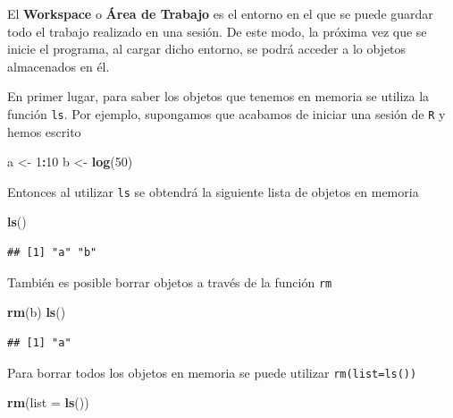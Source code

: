 \documentclass[]{book}
\newenvironment{Shaded}{\begin{snugshade}}{\end{snugshade}}
\newcommand{\DataTypeTok}[1]{\textcolor[rgb]{0.13,0.29,0.53}{#1}}
\newcommand{\DecValTok}[1]{\textcolor[rgb]{0.00,0.00,0.81}{#1}}
\newcommand{\KeywordTok}[1]{\textcolor[rgb]{0.13,0.29,0.53}{\textbf{#1}}}
\newcommand{\NormalTok}[1]{#1}
\newcommand{\OperatorTok}[1]{\textcolor[rgb]{0.81,0.36,0.00}{\textbf{#1}}}
\newcommand{\StringTok}[1]{\textcolor[rgb]{0.31,0.60,0.02}{#1}}
\begin{document}
El \textbf{Workspace} o \textbf{Área de Trabajo} es el entorno en el que se puede
guardar todo el trabajo realizado en una sesión. De este modo, la
próxima vez que se inicie el programa, al cargar dicho entorno, se podrá
acceder a lo objetos almacenados en él.

En primer lugar, para saber los objetos que tenemos en memoria se
utiliza la función \texttt{ls}. Por ejemplo, supongamos que acabamos de iniciar
una sesión de \texttt{R} y hemos escrito

\begin{Shaded}
\begin{Highlighting}[]
\NormalTok{a <-}\StringTok{ }\DecValTok{1}\OperatorTok{:}\DecValTok{10}
\NormalTok{b <-}\StringTok{ }\KeywordTok{log}\NormalTok{(}\DecValTok{50}\NormalTok{)}
\end{Highlighting}
\end{Shaded}

Entonces al utilizar \texttt{ls} se obtendrá la siguiente lista de objetos en
memoria

\begin{Shaded}
\begin{Highlighting}[]
\KeywordTok{ls}\NormalTok{()}
\end{Highlighting}
\end{Shaded}

\begin{verbatim}
## [1] "a" "b"
\end{verbatim}

También es posible borrar objetos a través de la función
\texttt{rm}

\begin{Shaded}
\begin{Highlighting}[]
\KeywordTok{rm}\NormalTok{(b)}
\KeywordTok{ls}\NormalTok{()}
\end{Highlighting}
\end{Shaded}

\begin{verbatim}
## [1] "a"
\end{verbatim}

Para borrar todos los objetos en memoria se puede utilizar
\texttt{rm(list=ls())}

\begin{Shaded}
\begin{Highlighting}[]
\KeywordTok{rm}\NormalTok{(}\DataTypeTok{list =} \KeywordTok{ls}\NormalTok{())}
\end{Highlighting}
\end{Shaded}
\end{document}
